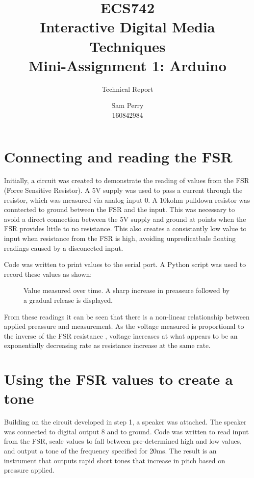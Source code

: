 \documentclass[titlepage]{scrartcl}
\begin{document}
    \title{ECS742\\Interactive Digital Media Techniques\\Mini-Assignment 1: Arduino}
    \subtitle{\LARGE{Technical Report}}
    \author{Sam Perry\\160842984}
    \date{}
    \maketitle

    \section{Connecting and reading the FSR}
    Initially, a circuit was created to demonstrate the reading of values from
    the FSR (Force Sensitive Resistor).  A 5V supply was used to pass a current
    through the resistor, which was measured via analog input 0.  A 10kohm
    pulldown resistor was conntected to ground between the FSR and the input.
    This was necessary to avoid a direct connection between the 5V supply and
    ground at points when the FSR provides little to no resistance. This also
    creates a consistantly low value to input when resistance from the FSR
    is high, avoiding unpredicatbale floating readings caused by a disconected
    input.\\
    \begin{figure}[H]
    \end{figure}

    Code was written to print values to the serial port. A Python script was
    used to record these values as shown:
    \begin{figure}[H]
        \caption{Value measured over time. A sharp increase in preassure followed by a gradual release is displayed.}
    \end{figure}

    From these readings it can be seen that there is a non-linear relationship
    between applied preassure and measurement. As the voltage measured is
    proportional to the inverse of the FSR resistance \parencite{ada2016},
    voltage increases at what appears to be an exponentially decreasing rate as
    resistance increase at the same rate.

    \section{Using the FSR values to create a tone}
    Building on the circuit developed in step 1, a speaker was attached. The
    speaker was connected to digital output 8 and to ground. Code was written
    to read input from the FSR, scale values to fall between pre-determined
    high and low values, and output a tone of the frequency specified for 20ms. 
    The result is an instrument that outputs rapid short tones that increase in
    pitch based on pressure applied.
\end{document}
